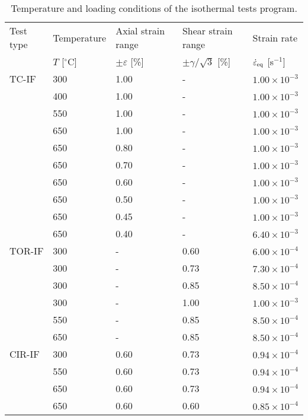 \begin{table}[ht]
  \centering
  \caption{Temperature and loading conditions of the isothermal tests program.}
    \begin{tabular}{p{2cm}<{\centering}p{2cm}<{\centering}p{3.5cm}<{\centering}p{3.5cm}<{\centering}p{2cm}<{\centering}}
    \toprule
    Test type & Temperature & Axial strain range & Shear strain range & Strain rate \\
          & $T$ [$^\circ$C] & $\pm \varepsilon$ [\%] & $\pm \gamma/ \sqrt 3$ [\%] & $\dot \varepsilon_{\rm{eq}}$ [s$^{-1}$] \\
    \midrule
    TC-IF    & 300   & 1.00  & -     & $1.00\times 10^{-3}$ \\
          & 400   & 1.00  & -     & $1.00\times 10^{-3}$ \\
          & 550   & 1.00  & -     & $1.00\times 10^{-3}$ \\
          & 650   & 1.00  & -     & $1.00\times 10^{-3}$ \\
          & 650   & 0.80  & -     & $1.00\times 10^{-3}$ \\
          & 650   & 0.70  & -     & $1.00\times 10^{-3}$ \\
          & 650   & 0.60  & -     & $1.00\times 10^{-3}$ \\
          & 650   & 0.50  & -     & $1.00\times 10^{-3}$ \\
          & 650   & 0.45  & -     & $1.00\times 10^{-3}$ \\
          & 650   & 0.40  & -     & $6.40\times 10^{-3}$ \\
    \midrule
    TOR-IF   & 300   & -     & 0.60  & $6.00\times 10^{-4}$ \\
          & 300   & -     & 0.73  & $7.30\times 10^{-4}$ \\
          & 300   & -     & 0.85  & $8.50\times 10^{-4}$ \\
          & 300   & -     & 1.00  & $1.00\times 10^{-3}$ \\
          & 550   & -     & 0.85  & $8.50\times 10^{-4}$ \\
          & 650   & -     & 0.85  & $8.50\times 10^{-4}$ \\
    \midrule
    CIR-IF  & 300   & 0.60  & 0.73  & $0.94\times 10^{-4}$ \\
          & 550   & 0.60  & 0.73  & $0.94\times 10^{-4}$ \\
          & 650   & 0.60  & 0.73  & $0.94\times 10^{-4}$ \\
          & 650   & 0.60  & 0.60  & $0.85\times 10^{-4}$ \\

\end{tabular}
\end{table}
